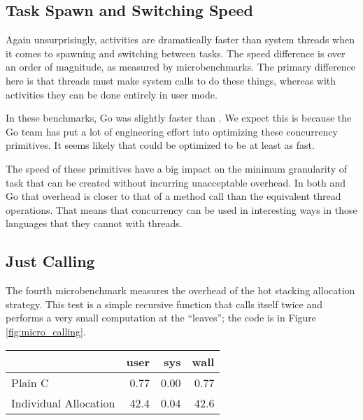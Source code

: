 \documentclass[a4paper,UKenglish,cleveref, autoref]{lipics-v2019}
\begin{document}

\subsection{Task Spawn and Switching Speed}

Again unsurprisingly, activities are dramatically faster than system threads when it comes to spawning and switching between tasks.
The speed difference is over an order of magnitude, as measured by microbenchmarks.
The primary difference here is that threads must make system calls to do these things, whereas with activities they can be done entirely in user mode.

In these benchmarks, Go was slightly faster than \charcoal{}.
We expect this is because the Go team has put a lot of engineering effort into optimizing these concurrency primitives.
It seems likely that \charcoal{} could be optimized to be at least as fast.

The speed of these primitives have a big impact on the minimum granularity of task that can be created without incurring unacceptable overhead.
In both \charcoal{} and Go that overhead is closer to that of a method call than the equivalent thread operations.
That means that concurrency can be used in interesting ways in those languages that they cannot with threads.

\subsection{Just Calling}

The fourth microbenchmark measures the overhead of the hot stacking allocation strategy.
This test is a simple recursive function that calls itself twice and performs a very small computation at the ``leaves''; the code is in Figure \ref{fig:micro_calling}.

\vspace{1em}
\begin{tabular}{|l|r|r|r|}
  \hline
   & user & sys & wall \\
  \hline
  \hline
  Plain C & 0.77 & 0.00 & 0.77 \\
  \hline
  Individual Allocation & 42.4 & 0.04 & 42.6 \\
  \hline
\end{tabular}
\vspace{1em}
\end{document}
